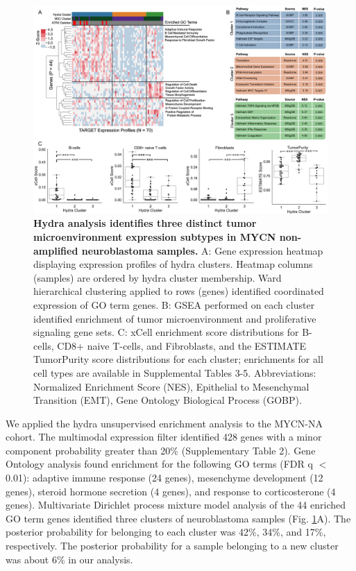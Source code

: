 \documentclass[10pt,letterpaper]{article}
\begin{document}
\begin{figure}[!h]
	\includegraphics[width=\textwidth]{img/MYCN-NA-Figure-V5@2x}
	\caption{{\bf Hydra analysis identifies three distinct tumor microenvironment expression subtypes in MYCN non-amplified neuroblastoma samples.}
		A: Gene expression heatmap displaying expression profiles of hydra clusters. Heatmap columns (samples) are ordered by hydra cluster membership. Ward hierarchical clustering applied to rows (genes) identified coordinated expression of GO term genes. B: GSEA performed on each cluster identified enrichment of tumor microenvironment and proliferative signaling gene sets. C: xCell enrichment score distributions for B-cells, CD8+ naive T-cells, and Fibroblasts, and the ESTIMATE TumorPurity score distributions for each cluster; enrichments for all cell types are available in Supplemental Tables 3-5. Abbreviations: Normalized Enrichment Score (NES), Epithelial to Mesenchymal Transition (EMT), Gene Ontology Biological Process (GOBP).
		\label{MYCN-NA}}
\end{figure}

We applied the hydra unsupervised enrichment analysis to the MYCN-NA cohort. The multimodal expression filter identified 428 genes with a minor component probability greater than 20\% (Supplementary Table 2). Gene Ontology analysis found enrichment for the following GO terms (FDR q $<$ 0.01): adaptive immune response (24 genes), mesenchyme development (12 genes), steroid hormone secretion (4 genes), and response to corticosterone (4 genes). Multivariate Dirichlet process mixture model analysis of the 44 enriched GO term genes identified three clusters of neuroblastoma samples (Fig. \ref{MYCN-NA}A). The posterior probability for belonging to each cluster was 42\%, 34\%, and 17\%, respectively. The posterior probability for a sample belonging to a new cluster was about 6\% in our analysis. 
\end{document}
